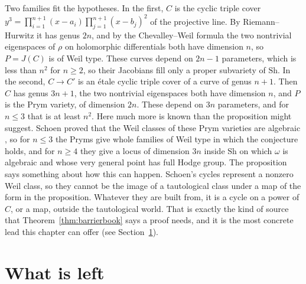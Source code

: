 Two families fit the hypotheses. In the first, $C$ is the cyclic triple
cover $y^{3}=\prod_{i=1}^{n+1}(x-a_{i})\prod_{j=1}^{n+1}(x-b_{j})^{2}$ of
the projective line. By Riemann--Hurwitz it has genus $2n$, and by the
Chevalley--Weil formula the two nontrivial eigenspaces of $\rho$ on
holomorphic differentials both have dimension $n$, so $P=J(C)$ is of Weil
type. These curves depend on $2n-1$ parameters, which is less than $n^{2}$
for $n\ge2$, so their Jacobians fill only a proper subvariety of $\mathrm{Sh}$. In
the second, $C\to C'$ is an \'etale cyclic triple cover of a curve of genus
$n+1$. Then $C$ has genus $3n+1$, the two nontrivial eigenspaces both have
dimension $n$, and $P$ is the Prym variety, of dimension $2n$. These
depend on $3n$ parameters, and for $n\le3$ that is at least $n^{2}$. Here
much more is known than the proposition might suggest. Schoen proved that
the Weil classes of these Prym varieties are algebraic \cite{Sch88}, so for
$n\le3$ the Pryms give whole families of Weil type in which the conjecture
holds, and for $n\ge4$ they give a locus of dimension $3n$ inside $\mathrm{Sh}$ on
which $\omega$ is algebraic and whose very general point has full Hodge
group. The proposition says something about how this can happen. Schoen's
cycles represent a nonzero Weil class, so they cannot be the image of a
tautological class under a map of the form in the proposition. Whatever
they are built from, it is a cycle on a power of $C$, or a map, outside the
tautological world. That is exactly the kind of source that
Theorem~\ref{thm:barrierbook} says a proof needs, and it is the most concrete
lead this chapter can offer (see Section~\ref{sec:leftbook}).

\section{What is left}\label{sec:leftbook}

